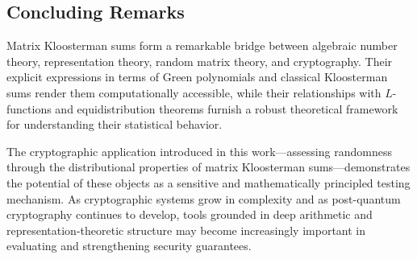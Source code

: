 \documentclass[11pt]{article}
\begin{document}
\subsection{Concluding Remarks}

Matrix Kloosterman sums form a remarkable bridge between algebraic number theory, representation theory, random matrix theory, and cryptography.  
Their explicit expressions in terms of Green polynomials and classical Kloosterman sums render them computationally accessible, while their relationships with $L$-functions and equidistribution theorems furnish a robust theoretical framework for understanding their statistical behavior.

The cryptographic application introduced in this work—assessing randomness through the distributional properties of matrix Kloosterman sums—demonstrates the potential of these objects as a sensitive and mathematically principled testing mechanism.  
As cryptographic systems grow in complexity and as post-quantum cryptography continues to develop, tools grounded in deep arithmetic and representation-theoretic structure may become increasingly important in evaluating and strengthening security guarantees.




\end{document}
